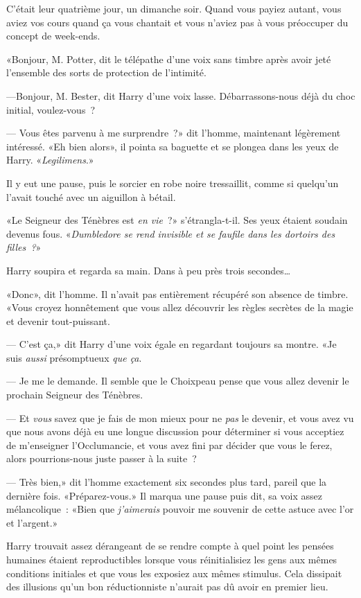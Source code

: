 C'était leur quatrième jour, un dimanche soir. Quand vous payiez autant, vous aviez vos cours quand ça vous chantait et vous n'aviez pas à vous préoccuper du concept de week-ends.

«Bonjour, M. Potter, dit le télépathe d'une voix sans timbre après avoir jeté l'ensemble des sorts de protection de l'intimité.

---Bonjour, M. Bester, dit Harry d'une voix lasse. Débarrassons-nous déjà du choc initial, voulez-vous~?

--- Vous êtes parvenu à me surprendre~?» dit l'homme, maintenant légèrement intéressé. «Eh bien alors», il pointa sa baguette et se plongea dans les yeux de Harry. «\emph{Legilimens}.»

Il y eut une pause, puis le sorcier en robe noire tressaillit, comme si quelqu'un l'avait touché avec un aiguillon à bétail.

«Le Seigneur des Ténèbres est \emph{en vie}~?» s'étrangla-t-il. Ses yeux étaient soudain devenus fous. «\emph{Dumbledore se rend invisible et se faufile dans les dortoirs des filles~?}»

Harry soupira et regarda sa main. Dans à peu près trois secondes…

«Donc», dit l'homme. Il n'avait pas entièrement récupéré son absence de timbre. «Vous croyez honnêtement que vous allez découvrir les règles secrètes de la magie et devenir tout-puissant.

--- C'est ça,» dit Harry d'une voix égale en regardant toujours sa montre. «Je suis \emph{aussi} présomptueux \emph{que ça}.

--- Je me le demande. Il semble que le Choixpeau pense que vous allez devenir le prochain Seigneur des Ténèbres.

--- Et \emph{vous} savez que je fais de mon mieux pour ne \emph{pas} le devenir, et vous avez vu que nous avons déjà eu une longue discussion pour déterminer si vous acceptiez de m'enseigner l'Occlumancie, et vous avez fini par décider que vous le ferez, alors pourrions-nous juste passer à la suite~?

--- Très bien,» dit l'homme exactement six secondes plus tard, pareil que la dernière fois. «Préparez-vous.» Il marqua une pause puis dit, sa voix assez mélancolique~: «Bien que \emph{j'aimerais} pouvoir me souvenir de cette astuce avec l'or et l'argent.»

Harry trouvait assez dérangeant de se rendre compte à quel point les pensées humaines étaient reproductibles lorsque vous réinitialisiez les gens aux mêmes conditions initiales et que vous les exposiez aux mêmes stimulus. Cela dissipait des illusions qu'un bon réductionniste n'aurait pas dû avoir en premier lieu.

